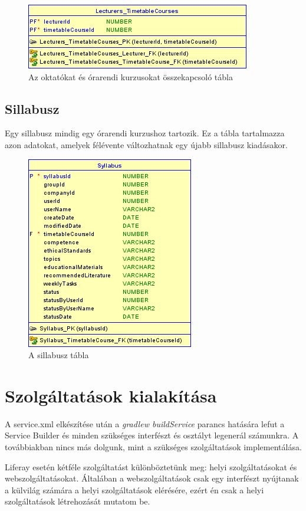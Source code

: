 \documentclass[hidelinks, 12pt, a4paper]{report}
\begin{document}
\begin{figure}[H]
    \centering
	\includegraphics{lecturer_timetable_course.png}
	\caption{Az oktatókat és órarendi kurzusokat összekapcsoló tábla}
\end{figure}

\subsection{Sillabusz}

Egy sillabusz mindig egy órarendi kurzushoz tartozik. Ez a tábla tartalmazza azon adatokat, amelyek félévente változhatnak egy újabb sillabusz kiadásakor.

\begin{figure}[H]
    \centering
	\includegraphics{syllabus.png}
	\caption{A sillabusz tábla}
\end{figure}

\section{Szolgáltatások kialakítása}

A service.xml elkészítése után a \emph{gradlew buildService} parancs hatására lefut a Service Builder és minden szükséges interfészt és osztályt legenerál számunkra. A továbbiakban nincs más dolgunk, mint a szükséges szolgáltatások implementálása.

Liferay esetén kétféle szolgáltatást különböztetünk meg: helyi szolgáltatásokat és webszolgáltatásokat. Általában a webszolgáltatások csak egy interfészt nyújtanak a külvilág számára a helyi szolgáltatások elérésére, ezért én csak a helyi szolgáltatások létrehozását mutatom be.
\end{document}
